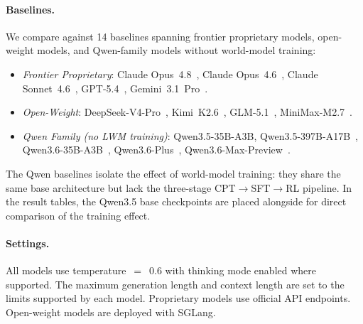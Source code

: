 \paragraph{Baselines.}
We compare against 14 baselines spanning frontier proprietary models, open-weight models, and Qwen-family models without world-model training:
\begin{itemize}[nosep,leftmargin=*]
  \item \textit{Frontier Proprietary}: Claude Opus~4.8~\citep{opus4.8}, Claude Opus~4.6~\citep{opus4.6}, Claude Sonnet~4.6~\citep{sonnet4.6}, GPT-5.4~\citep{gpt-5.4}, Gemini~3.1~Pro~\citep{gemini3.1pro}.
  \item \textit{Open-Weight}: DeepSeek-V4-Pro~\citep{deepseekai2026deepseekv4}, Kimi~K2.6~\citep{team2026kimi}, GLM-5.1~\citep{zeng2026glm}, MiniMax-M2.7~\citep{minimax2026minimax}.
  \item \textit{Qwen Family (no LWM training)}: Qwen3.5-35B-A3B, Qwen3.5-397B-A17B~\citep{qwen35blog}, Qwen3.6-35B-A3B~\citep{qwen36_35b_a3b}, Qwen3.6-Plus~\citep{qwen36plus}, Qwen3.6-Max-Preview~\citep{qwen36_max_preview}.
\end{itemize}
The Qwen baselines isolate the effect of world-model training: they share the same base architecture but lack the three-stage CPT$\to$SFT$\to$RL pipeline.
In the result tables, the Qwen3.5 base checkpoints are placed alongside \method for direct comparison of the training effect.

\paragraph{Settings.}
All models use temperature~$=$~0.6 with thinking mode enabled where supported.
The maximum generation length and context length are set to the limits supported by each model.
Proprietary models use official API endpoints.
Open-weight models are deployed with SGLang.





